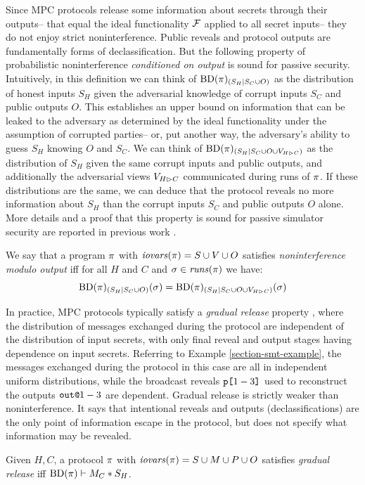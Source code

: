 Since MPC protocols release some information about secrets through
their outputs-- that equal the ideal functionality
$\mathcal{F}$ applied to all secret inputs-- they do not enjoy strict
noninterference. Public reveals and protocol outputs are fundamentally
forms of declassification. But the following property of probabilistic
noninterference \emph{conditioned on output} is sound for passive
security. Intuitively, in this definition we can think of
$\mathrm{BD}(\pi)_{({S_H}|{S_C \cup O})}$ as the distribution of
honest inputs $S_H$ given the adversarial knowledge of corrupt inputs
$S_C$ and public outputs $O$. This establishes an upper bound on
information that can be leaked to the adversary as determined by the
ideal functionality under the assumption of corrupted parties-- or,
put another way, the adversary's ability to guess $S_H$ knowing $O$
and $S_C$.  We can think of $\mathrm{BD}(\pi)_{({S_H}|{S_C \cup O
  \cup V_{H \rhd C}})}$ as the distribution of $S_H$ given the same corrupt
inputs and public outputs, and additionally the adversarial views
$V_{H \rhd C}$ communicated during runs of $\pi$. If these
distributions are the same, we can deduce that the protocol reveals no
more information about $S_H$ than the corrupt inputs $S_C$ and public
outputs $O$ alone. More details and a proof that this property is
sound for passive simulator security are reported in previous work
\cite{skalka-near-ppdp24}.
\begin{definition}
  \label{definition-NIMO}
  We say that a program $\pi$ with $\mathit{iovars}(\pi) = S \cup V \cup O$
  satisfies \emph{noninterference modulo output}
  iff for all $H$ and $C$ and $\sigma \in \mathit{runs}(\pi)$ 
  we have:
  $$
  \mathrm{BD}(\pi)_{({S_H}|{S_C \cup O})}(\sigma) = \mathrm{BD}(\pi)_{({S_H}|{S_C \cup O \cup V_{H \rhd C}})}(\sigma)
 $$
\end{definition}

In practice, MPC protocols typically satisfy a \emph{gradual release}
property \cite{sabelfeld2009declassification}, where the distribution
of messages exchanged during the protocol are independent of the
distribution of input secrets, with only final reveal and output
stages having dependence on input secrets. Referring to Example
\ref{section-smt-example}, the messages exchanged during the protocol
in this case are all in independent uniform distributions, while the
broadcast reveals $\texttt{p[}1-3\texttt{]}$ used to reconstruct the outputs
$\texttt{out}\texttt{@}1-3$ are dependent. Gradual release is strictly weaker than
noninterference. It says that intentional reveals and outputs
(declassifications) are the only point of information escape in the
protocol, but does not specify what information may be revealed.
\begin{definition}
  Given $H,C$, a protocol $\pi$ with $\mathit{iovars}(\pi) = S \cup M \cup P \cup O$
  satisfies \emph{gradual release} iff
  $\mathrm{BD}(\pi) \vdash M_C * S_H$.
\end{definition}

